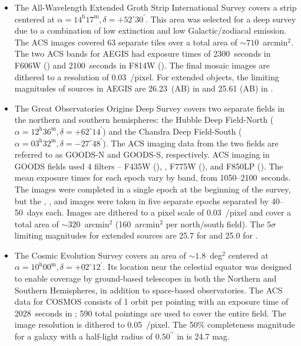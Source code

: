 \documentclass[twocolumn]{aastex6}
\begin{document}
\begin{itemize}
\item The All-Wavelength Extended Groth Strip International Survey \citep[AEGIS;][]{dav07} covers a strip centered at $\alpha=14^\textrm{h}17^\textrm{m}, \delta=+52^\circ30^\prime$. This area was selected for a deep survey due to a combination of low extinction and low Galactic/zodiacal emission. The ACS images covered 63 separate tiles over a total area of $\sim710$~arcmin$^2$. The two ACS bands for AEGIS had exposure times of 2300~seconds in F606W (\Vband) and 2100~seconds in F814W (\Iband). The final mosaic images are dithered to a resolution of 0.03~\arcsec/pixel. For extended objects, the limiting magnitudes of sources in AEGIS are 26.23~(AB) in \Vband{} and 25.61 (AB) in \Iband. 

\item The Great Observatories Origins Deep Survey \citep[GOODS;][]{gia04} covers two separate fields in the northern and southern hemispheres: the Hubble Deep Field-North ($\alpha=12^\textrm{h}36^\textrm{m}, \delta=+62^\circ14^\prime$) and the Chandra Deep Field-South ($\alpha=03^\textrm{h}32^\textrm{m}, \delta=-27^\circ48^\prime$). The \hst{} ACS imaging data from the two fields are referred to as GOODS-N and GOODS-S, respectively. ACS imaging in GOODS fields used 4 filters -- F435W (\Bband), \Vband, F775W (\iband), and F850LP (\zband). The mean exposure times for each epoch vary by band, from 1050--2100~seconds. The \Bband{} images were completed in a single epoch at the beginning of the survey, but the \Vband, \iband, and \zband{} images were taken in five separate epochs separated by 40--50~days each. Images are dithered to a pixel scale of 0.03~\arcsec/pixel and cover a total area of $\sim320$~arcmin$^2$ (160~arcmin$^2$ per north/south field). The $5\sigma$ limiting magnitudes for extended sources are 25.7 for \Vband{} and 25.0 for \iband. 

\item The Cosmic Evolution Survey \citep[COSMOS;][]{sco07} covers an area of $\sim1.8$~deg$^2$ centered at $\alpha=10^\textrm{h}00^\textrm{m}, \delta=+02^\circ12^\prime$. Its location near the celestial equator was designed to enable coverage by ground-based telescopes in both the Northern and Southern Hemispheres, in addition to space-based observatories. The ACS data for COSMOS consists of 1 orbit per pointing with an exposure time of 2028~seconds in \Iband; 590 total pointings are used to cover the entire field. The image resolution is dithered to 0.05~\arcsec/pixel. The 50\% completeness magnitude for a galaxy with a half-light radius of $0.50^{\prime\prime}$ in \Iband{} is 24.7 mag. 


\end{itemize}
\end{document}
